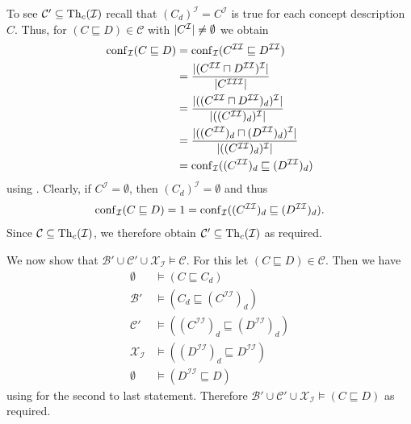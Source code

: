 \begin{Proof}
  To see $\mathcal{C}' \subseteq \operatorname{Th}_c(\mathcal{I})$ recall that $(C_d)^{\mathcal{I}} =
  C^{\mathcal{I}}$ is true for each \ELgfpbot concept description $C$.  Thus, for $(C
  \sqsubseteq D) \in \mathcal{C}$ with $\lvert C^{\mathcal{I}} \rvert \neq \emptyset$ we obtain
  \begin{align*}
    \operatorname{conf}_{\mathcal{I}}( C \sqsubseteq D )
    &= \operatorname{conf}_{\mathcal{I}}( C^{\mathcal{I}\mathcal{I}} \sqsubseteq D^{\mathcal{I}\mathcal{I}} )\\
    &= \frac{ | ( C^{\mathcal{I}\mathcal{I}} \sqcap D^{\mathcal{I}\mathcal{I}}
      )^{\mathcal{I}} | }{ | C^{\mathcal{I}\mathcal{I}\mathcal{I}} | }\\
    &= \frac{ | (( C^{\mathcal{I}\mathcal{I}} \sqcap D^{\mathcal{I}\mathcal{I}}
      )_d)^{\mathcal{I}} | }{ | ((C^{\mathcal{I}\mathcal{I}})_d)^{\mathcal{I}} | }\\
    &= \frac{ | ( (C^{\mathcal{I}\mathcal{I}})_d \sqcap (D^{\mathcal{I}\mathcal{I}})_d
      )^{\mathcal{I}} | }{ | ((C^{\mathcal{I}\mathcal{I}})_d)^{\mathcal{I}} | }\\
    &= \operatorname{conf}_{\mathcal{I}}( (C^{\mathcal{I}\mathcal{I}})_d \sqsubseteq (D^{\mathcal{I}\mathcal{I}})_d )
  \end{align*}
  using .  Clearly, if $C^{\mathcal{I}} =
  \emptyset$, then $(C_d)^{\mathcal{I}} = \emptyset$ and thus
  \begin{equation*}
    \operatorname{conf}_{\mathcal{I}}( C \sqsubseteq D ) = 1 = \operatorname{conf}_{\mathcal{I}}(
    (C^{\mathcal{I}\mathcal{I}})_d \sqsubseteq (D^{\mathcal{I}\mathcal{I}})_d ).
  \end{equation*}
  Since $\mathcal{C} \subseteq \operatorname{Th}_c(\mathcal{I})$, we therefore obtain $\mathcal{C}'
  \subseteq \operatorname{Th}_c(\mathcal{I})$ as required.

  We now show that $\mathcal{B}' \cup \mathcal{C}' \cup \mathcal{X}_{\mathcal{I}} \models
  \mathcal{C}$.  For this let $(C \sqsubseteq D) \in \mathcal{C}$.  Then we have
  \begin{align*}
    \emptyset &\models (C \sqsubseteq C_d)\\
    \mathcal{B}' &\models (C_d \sqsubseteq (C^{\mathcal{I}\mathcal{I}})_d)\\
    \mathcal{C}' &\models ((C^{\mathcal{I}\mathcal{I}})_d \sqsubseteq
    (D^{\mathcal{I}\mathcal{I}})_d)\\
    \mathcal{X}_{\mathcal{I}} &\models ((D^{\mathcal{I}\mathcal{I}})_d \sqsubseteq
    D^{\mathcal{I}\mathcal{I}})\\
    \emptyset &\models (D^{\mathcal{I}\mathcal{I}} \sqsubseteq D)
  \end{align*}
  using  for the second to last statement.  Therefore
  $\mathcal{B}' \cup \mathcal{C}' \cup \mathcal{X}_{\mathcal{I}} \models (C \sqsubseteq
  D)$ as required.


\end{Proof}

